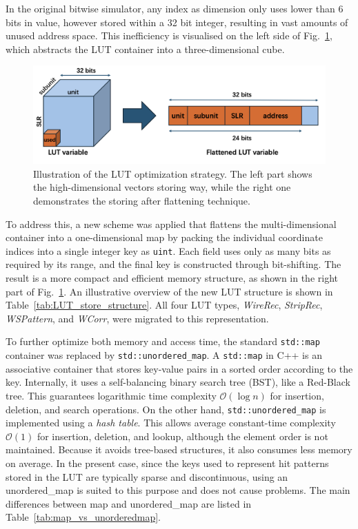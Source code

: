 In the original bitwise simulator, any index as dimension only uses lower than 6 bits in value, however stored within a 32 bit integer, resulting in vast amounts of unused address space. This inefficiency is visualised on the left side of Fig.~\ref{fig:LUT_optimization}, which abstracts the LUT container into a three-dimensional cube.
\begin{figure}[htbp]
  \centering
  \includegraphics[width=1.0\textwidth]{figs/chapter5/LUT_optimization.png}
  \caption{Illustration of the LUT optimization strategy. The left part shows the high-dimensional vectors storing way, while the right one demonstrates the storing after flattening technique.}
  \label{fig:LUT_optimization}
\end{figure}

To address this, a new scheme was applied that flattens the multi-dimensional container into a one-dimensional map by packing the individual coordinate indices into a single integer key as \texttt{uint}. Each field uses only as many bits as required by its range, and the final key is constructed through bit-shifting. The result is a more compact and efficient memory structure, as shown in the right part of Fig.~\ref{fig:LUT_optimization}. An illustrative overview of the new LUT structure is shown in Table~\ref{tab:LUT_store_structure}. All four LUT types, \textit{WireRec}, \textit{StripRec}, \textit{WSPattern}, and \textit{WCorr}, were migrated to this representation.


To further optimize both memory and access time, the standard \texttt{std::map} container was replaced by \texttt{std::unordered\_map}. A \texttt{std::map} in C++ is an associative container that stores key-value pairs in a sorted order according to the key. Internally, it uses a self-balancing binary search tree (BST), like a Red-Black tree. This guarantees logarithmic time complexity $\mathcal{O}(\log n)$ for insertion, deletion, and search operations. On the other hand, \texttt{std::unordered\_map} is implemented using a \textit{hash table}. This allows average constant-time complexity $\mathcal{O}(1)$ for insertion, deletion, and lookup, although the element order is not maintained. Because it avoids tree-based structures, it also consumes less memory on average. In the present case, since the keys used to represent hit patterns stored in the LUT are typically sparse and discontinuous, using an unordered\_map is suited to this purpose and does not cause problems. The main differences between map and unordered\_map are listed in Table~\ref{tab:map_vs_unorderedmap}.


